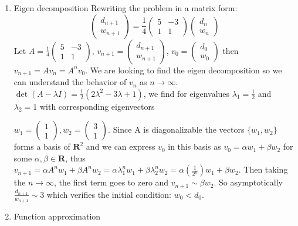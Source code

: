 \documentclass[10pt]{article}
\newcommand{\0}{\mat{0}}
\begin{document}
\begin{enumerate}
\item Eigen decomposition
Rewriting the problem in a matrix form: 
$$
\begin{pmatrix}
	d_{n+1} \\
	w_{n+1}
\end{pmatrix}
= \frac{1}{4}
\begin{pmatrix}
	5 & -3 \\
	1 & 	1
\end{pmatrix}
\begin{pmatrix}
	d_n \\
	w_n
\end{pmatrix}
$$
Let  $A = \frac{1}{4}
\begin{pmatrix}
	5 & -3 \\
	1 & 	1
\end{pmatrix}$, $v_{n+1} = \begin{pmatrix}
	d_{n+1} \\
	w_{n+1}
\end{pmatrix}$, $v_0 =  \begin{pmatrix} d_0 \\ w_0 \end{pmatrix}$ then $v_{n+1}= A v_n = A^n v_0$. We are looking to find the eigen decomposition so we can understand the behavior of $v_n$ as $n \rightarrow \infty$.
$\det(A - \lambda I) =  \frac{1}{2}  (2 \lambda^2 -3 \lambda + 1)$, we find for eigenvalues $\lambda_1=\frac{1}{2}$ and $\lambda_2=1$ with corresponding eigenvectors 

$w_1=\begin{pmatrix} 1 \\ 1 \end{pmatrix}, w_2 = \begin{pmatrix} 3 \\ 1 \end{pmatrix}$. Since A is diagonalizable the vectors $\{w_1, w_2\}$ forms a basis of $\mathbf{R}^2$ 
and we can express $v_0$ in this basis as $v_0 = \alpha w_1 + \beta w_2$ for some $\alpha,\beta \in \mathbf{R}$, 
thus $v_{n+1} = \alpha A^n w_1 + \beta A^n w_2 = \alpha \lambda_1^n w_1 + \beta \lambda_2^n w_2 = \alpha (\frac{1}{2^n}) w_1 + \beta w_2$. Then taking the $n\to\infty$, the first term goes to zero and $v_{n+1} \sim \beta w_2$. So asymptotically $\frac{d_{n+1}} {w_{n+1}} \sim 3$ which verifies the initial condition: $w_0 < d_0$. 
 
\item Function approximation


\end{enumerate}
\end{document}
